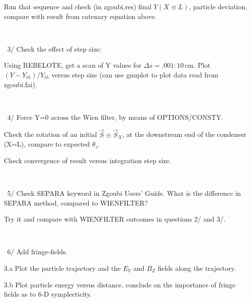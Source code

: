 \documentclass[10pt]{article}
\newcommand{\nin}{\noindent~}
\begin{document}
 Run that sequence and check (in zgoubi.res)  final $Y(X\equiv L)$,  particle deviation, compare with result from catenary equation above.

~

\nin 3/ Check the effect of step size:

Using REBELOTE, get a scan of Y values for $ \Delta s = .001:10$\,cm.
   Plot $(Y-Y_{th})/Y_{th}$ versus step size (can use gnuplot to plot data read from zgoubi.fai).

   ~

   \nin 4/
   Force Y=0 across the Wien filter, by means of OPTIONS/CONSTY.

   Check the rotation of an initial $\vec S \equiv \vec S_X$, at the downstream end of the condenser (X=L), compare to expected $\theta_s$. 

Check convergence of result versus integration step size. 
   
   ~

   \nin 5/ Check SEPARA keyword in Zgoubi Users' Guide. What is the difference in SEPARA method, compared to WIENFILTER?

Try it and compare with WIENFILTER outcomes in questions 2/ and 3/.
  
   ~

   \nin 6/ Add fringe-fields.

   3.a  Plot the particle trajectory and the $E_Y$ and $B_Z$ fields along the trajectory.

   3.b  Plot particle energy versus distance, conclude on the importance of fringe fields as to 6-D symplecticity. 




   
\end{document}
